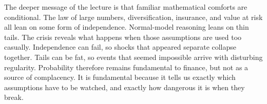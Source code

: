 The deeper message of the lecture is that familiar mathematical comforts are conditional. The law of large numbers, diversification, insurance, and value at risk all lean on some form of independence. Normal-model reasoning leans on thin tails. The crisis reveals what happens when those assumptions are used too casually. Independence can fail, so shocks that appeared separate collapse together. Tails can be fat, so events that seemed impossible arrive with disturbing regularity. Probability therefore remains fundamental to finance, but not as a source of complacency. It is fundamental because it tells us exactly which assumptions have to be watched, and exactly how dangerous it is when they break.